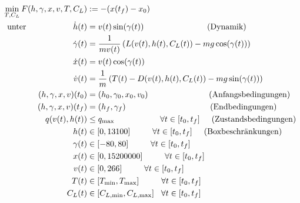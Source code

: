 \[\begin{split}
\min_{T, C_L} F(h,\gamma,x,v,T,C_L) &:= -(x(t_f) - x_0) \\\
\text{unter} \hspace{20mm} \dot{h}(t) &= v(t) \sin(\gamma(t)) \hspace{27mm} \text{(Dynamik)} \\\
\dot{\gamma}(t) &=  \dfrac{1}{mv(t)} \left( L(v(t),h(t),C_L(t)) - mg \cos(\gamma(t)) \right) \\\
\dot{x}(t) &= v(t) \cos(\gamma(t))\\\
\dot{v}(t) &= \dfrac{1}{m} \left( T(t) - D(v(t),h(t),C_L(t)) - mg \sin(\gamma(t)) \right) \\\
%
(h,\gamma,x,v)(t_0) &= (h_0,\gamma_0,x_0,v_0) \hspace{26mm} \text{(Anfangsbedingungen)}\\\
(h,\gamma,x,v)(t_f) &= (h_f,\gamma_f) \hspace{36mm} \text{(Endbedingungen)}\\\
%
q(v(t),h(t)) &\leq q_{\max} \hspace{19.5mm} \forall t \in [t_0,t_f] \hspace{5mm} \text{(Zustandsbedingungen)}\\\
h(t) &\in [0,13100] \hspace{9.5mm} \forall t \in [t_0,t_f] \hspace{5mm} \text{(Boxbeschränkungen)}\\\
\gamma(t) &\in [-80,80] \hspace{9.5mm} \forall t \in [t_0,t_f]\\\
x(t) &\in [0,15200000] \hspace{9.5mm} \forall t \in [t_0,t_f]\\\
v(t) &\in [0,266] \hspace{9.5mm} \forall t \in [t_0,t_f]\\\
T(t) &\in [T_{\min},T_{\max}] \hspace{9.5mm} \forall t \in [t_0,t_f]\\\
C_L(t) &\in [C_{L, \min},C_{L, \max}] \hspace{3mm} \forall t \in [t_0,t_f]
\end{split} \]

\newpage
